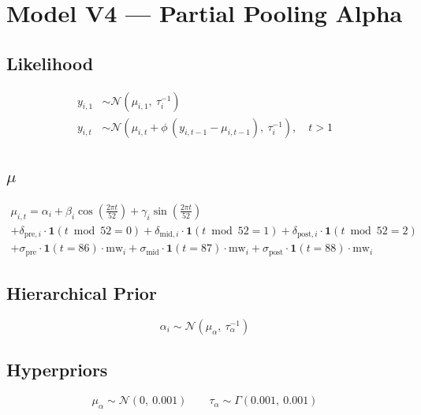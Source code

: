 \documentclass{article}
\begin{document}
\section*{Model V4 --- Partial Pooling Alpha}

\subsection*{Likelihood}

\begin{align}
  y_{i,1} &\sim \mathcal{N}(\mu_{i,1},\ \tau_i^{-1}) \\[6pt]
  y_{i,t} &\sim \mathcal{N}\left(\mu_{i,t} + \phi\,(y_{i,t-1} - \mu_{i,t-1}),\ \tau_i^{-1}\right), \quad t > 1
\end{align}

\subsection*{$\mu$}

\begin{multline}
  \mu_{i,t} = \alpha_i
    + \beta_i \cos\left(\tfrac{2\pi t}{52}\right)
    + \gamma_i \sin\left(\tfrac{2\pi t}{52}\right) \\
    + \delta_{\text{pre},i} \cdot \mathbf{1}(t \bmod 52 = 0)
    + \delta_{\text{mid},i} \cdot \mathbf{1}(t \bmod 52 = 1)
    + \delta_{\text{post},i} \cdot \mathbf{1}(t \bmod 52 = 2) \\
    + \sigma_{\text{pre}} \cdot \mathbf{1}(t = 86) \cdot \mathrm{mw}_i
    + \sigma_{\text{mid}} \cdot \mathbf{1}(t = 87) \cdot \mathrm{mw}_i
    + \sigma_{\text{post}} \cdot \mathbf{1}(t = 88) \cdot \mathrm{mw}_i
\end{multline}

\subsection*{Hierarchical Prior}

\begin{equation}
  \alpha_i \sim \mathcal{N}(\mu_\alpha,\ \tau_\alpha^{-1})
\end{equation}

\subsection*{Hyperpriors}

\begin{equation}
  \mu_\alpha \sim \mathcal{N}(0,\ 0.001) \qquad \tau_\alpha \sim \Gamma(0.001,\ 0.001)
\end{equation}
\end{document}
